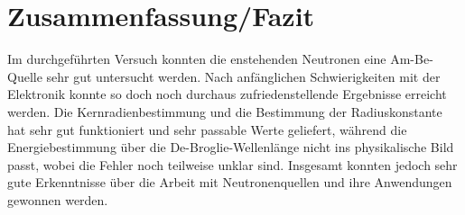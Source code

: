 \section{Zusammenfassung/Fazit}
Im durchgeführten Versuch konnten die enstehenden Neutronen eine Am-Be-Quelle sehr gut untersucht werden. Nach anfänglichen Schwierigkeiten mit der Elektronik konnte so doch noch durchaus zufriedenstellende Ergebnisse erreicht werden. Die Kernradienbestimmung und die Bestimmung der Radiuskonstante hat sehr gut funktioniert und sehr passable Werte geliefert, während die Energiebestimmung über die De-Broglie-Wellenlänge nicht ins physikalische Bild passt, wobei die Fehler noch teilweise unklar sind. Insgesamt konnten jedoch sehr gute Erkenntnisse über die Arbeit mit Neutronenquellen und ihre Anwendungen gewonnen werden.